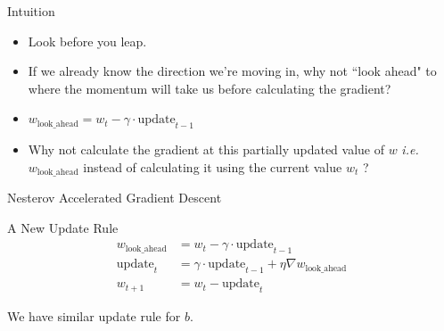 \documentclass[10pt, aspectratio=169]{beamer}
\begin{document}
\begin{frame}
\begin{block}{Intuition}
\begin{itemize}
\item<1-> Look before you leap.
\item<2-> If we already know the direction we’re moving in, why not ``look ahead" to where the momentum will take us before calculating the gradient?
\item<3-> $w_{\text{look\_ahead}} = w_t - \gamma \cdot \text{update}_{t-1}$
\item<4-> Why not calculate the gradient at this partially updated value
 of $w$ \textit{i.e.} $w_{\text{look\_ahead}}$ instead of calculating it using the current value $w_t$ ?
\end{itemize}
\end{block}
\end{frame}



\begin{frame}{Nesterov Accelerated Gradient Descent}
\begin{block}{A New Update Rule}
\begin{align*}
w_{\text{look\_ahead}} &= w_t - \gamma \cdot \text{update}_{t-1} \\
\text{update}_t &= \gamma \cdot \text{update}_{t-1} + \eta \nabla w_{\text{look\_ahead}} \\
w_{t+1} &= w_t - \text{update}_t
\end{align*}

We have similar update rule for $b$.
\end{block}
\end{frame}
\end{document}
